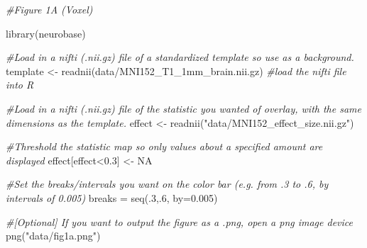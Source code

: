 \documentclass{article}
\newenvironment{Shaded}{\begin{snugshade}}{\end{snugshade}}
\newcommand{\AttributeTok}[1]{\textcolor[rgb]{0.77,0.63,0.00}{#1}}
\newcommand{\CommentTok}[1]{\textcolor[rgb]{0.56,0.35,0.01}{\textit{#1}}}
\newcommand{\ConstantTok}[1]{\textcolor[rgb]{0.00,0.00,0.00}{#1}}
\newcommand{\DecValTok}[1]{\textcolor[rgb]{0.00,0.00,0.81}{#1}}
\newcommand{\FloatTok}[1]{\textcolor[rgb]{0.00,0.00,0.81}{#1}}
\newcommand{\FunctionTok}[1]{\textcolor[rgb]{0.00,0.00,0.00}{#1}}
\newcommand{\NormalTok}[1]{#1}
\newcommand{\OtherTok}[1]{\textcolor[rgb]{0.56,0.35,0.01}{#1}}
\newcommand{\SpecialCharTok}[1]{\textcolor[rgb]{0.00,0.00,0.00}{#1}}
\newcommand{\StringTok}[1]{\textcolor[rgb]{0.31,0.60,0.02}{#1}}
\begin{document}
\singlespacing

\begin{Shaded}
\begin{Highlighting}[]
\CommentTok{\#Figure 1A (Voxel)}

\FunctionTok{library}\NormalTok{(neurobase)}

\CommentTok{\#Load in a nifti (.nii.gz) file of a standardized template so use as a background. }
\NormalTok{template }\OtherTok{\textless{}{-}} \FunctionTok{readnii}\NormalTok{(}\StringTok{\textquotesingle{}data/MNI152\_T1\_1mm\_brain.nii.gz\textquotesingle{}}\NormalTok{) }\CommentTok{\#load the nifti file into R}

\CommentTok{\#Load in a nifti (.nii.gz) file of the statistic you wanted of overlay, with the same dimensions as the template.  }
\NormalTok{effect }\OtherTok{\textless{}{-}} \FunctionTok{readnii}\NormalTok{(}\StringTok{"data/MNI152\_effect\_size.nii.gz"}\NormalTok{) }

\CommentTok{\#Threshold the statistic map so only values about a specified amount are displayed}
\NormalTok{effect[effect}\SpecialCharTok{\textless{}}\FloatTok{0.3}\NormalTok{] }\OtherTok{\textless{}{-}} \ConstantTok{NA} 

\CommentTok{\#Set the breaks/intervals you want on the color bar (e.g. from .3 to .6, by intervals of 0.005)}
\NormalTok{breaks }\OtherTok{=} \FunctionTok{seq}\NormalTok{(.}\DecValTok{3}\NormalTok{,.}\DecValTok{6}\NormalTok{, }\AttributeTok{by=}\FloatTok{0.005}\NormalTok{)}

\CommentTok{\#[Optional] If you want to output the figure as a .png, open a png image device}
\FunctionTok{png}\NormalTok{(}\StringTok{"data/fig1a.png"}\NormalTok{) }


\end{Highlighting}
\end{Shaded}
\end{document}
